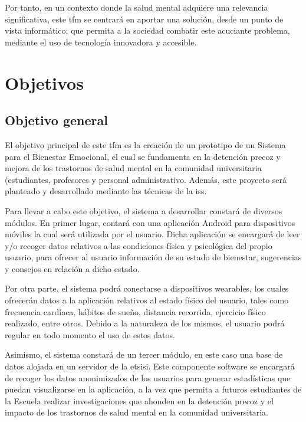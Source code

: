 Por tanto, en un contexto donde la salud mental adquiere una relevancia significativa, este \gls{tfm} se centrará en aportar una solución, desde un punto de vista informático; que permita a la sociedad combatir este acuciante problema, mediante el uso de tecnología innovadora y accesible.

\section{Objetivos}
    \label{sec:objetivos}

    \subsection{Objetivo general}

        El objetivo principal de este \gls{tfm} es la creación de un prototipo de un Sistema para el Bienestar Emocional, el cual se fundamenta en la detención precoz y mejora de los trastornos de salud mental en la comunidad universitaria (estudiantes, profesores y personal administrativo.  Además, este proyecto será planteado y desarrollado mediante las técnicas de la \gls{iss}.
    
        Para llevar a cabo este objetivo, el sistema a desarrollar constará de diversos módulos. En primer lugar, contará con una aplicación Android para dispositivos móviles la cual será utilizada por el usuario. Dicha aplicación se encargará de leer y/o recoger datos relativos a las condiciones física y psicológica del propio usuario, para ofrecer al usuario información de su estado de bienestar, sugerencias y consejos en relación a dicho estado.
    
        Por otra parte, el sistema podrá conectarse a dispositivos \glspl{wearable}, los cuales ofrecerán datos a la aplicación relativos al estado físico del usuario, tales como frecuencia cardíaca, hábitos de sueño, distancia recorrida, ejercicio físico realizado, entre otros. 
        Debido a la naturaleza de los mismos, el usuario podrá regular en todo momento el uso de estos datos.
    
        Asimismo, el sistema constará de un tercer módulo, en este caso una base de datos alojada en un servidor de la \gls{etsisi}. Este componente software se encargará de recoger los datos anonimizados de los usuarios para generar estadísticas que puedan visualizarse en la aplicación, a la vez que permita a futuros estudiantes de la Escuela realizar investigaciones que ahonden en la detención precoz y el impacto de los trastornos de salud mental en la comunidad universitaria.

